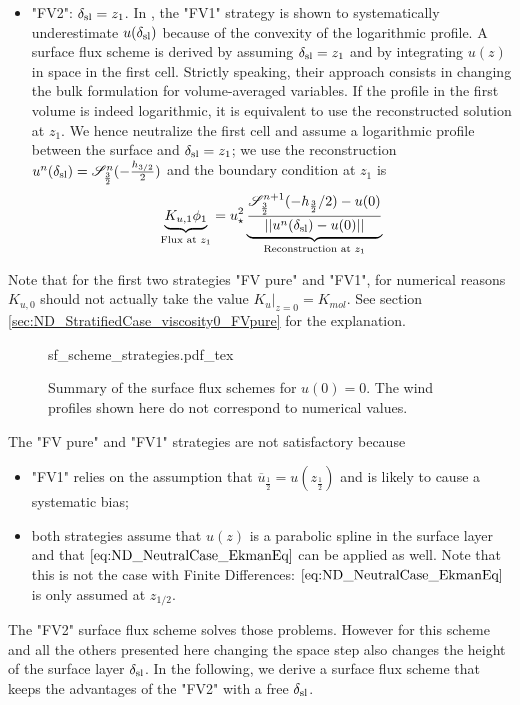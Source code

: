 \begin{itemize}
    \item "FV2":  $\delta_{\rm sl} = z_{1}$. In
    \cite{nishizawa_surface_2018}, the "FV1" strategy is shown to systematically
	  underestimate $u(\delta_{\rm sl})$ because of the 
	  convexity of the logarithmic profile.
	A surface flux scheme is derived by assuming
	  $\delta_{\rm sl} = z_1$ and by integrating $u(z)$
	  in space in the first cell.
	Strictly speaking, their approach consists in changing the
	bulk formulation for volume-averaged variables. If the
	profile in the first volume is indeed logarithmic, it
	is equivalent to use the reconstructed solution at
	$z_1$. We hence neutralize the first cell and assume
	a logarithmic profile between the surface and
	$\delta_{\rm sl}=z_1$;
	we use the reconstruction
	$u^n(\delta_{\rm sl}) = {\cal S}^n_{\frac{3}{2}}(
	  -\frac{h_{3/2}}{2})$ and the boundary condition
		  at $z_1$ is
	\begin{equation}
		\underbrace{K_{u,1} \phi_1}_{\text{Flux at } z_1}
		= u_\star^2 
		  \underbrace{\frac{{\cal S}_{\frac{3}{2}}^{n+1}
			(-h_{\frac{3}{2}}/2)-u(0)}
			{||u^n(\delta_{\rm sl})-u(0)||}}_{
				\text{Reconstruction at } z_1
			}
	\end{equation}
	  
  \end{itemize}
  Note that for the first two strategies "FV pure" and
  "FV1", for numerical reasons $K_{u,0}$
  should not actually
  take the value $\left. K_{u}\right|_{z=0} = K_{mol}$.
  See section \ref{sec:ND_StratifiedCase_viscosity0_FVpure} for
  the explanation.

\begin{figure}
	\centering
	{sf_scheme_strategies.pdf_tex}
	\caption{Summary of the surface flux schemes for $u(0)=0$.
	The wind profiles shown here do not correspond to
	numerical values.}
	\label{fig:ND_NeutralCase_summary_sfscheme}
\end{figure}

The "FV pure" and "FV1" strategies are not satisfactory because
\begin{itemize}
	\item "FV1" relies on the assumption that
		$\overline{u}_{\frac{1}{2}} = u(z_{\frac{1}{2}})$
		and is likely to cause a systematic bias;
	\item both strategies assume that $u(z)$ is a parabolic spline in the surface layer and that $\eqref{eq:ND_NeutralCase_EkmanEq}$
		can be applied as well. Note that this is not
		the case with Finite Differences:
		$\eqref{eq:ND_NeutralCase_EkmanEq}$ is only assumed
		at $z_{1/2}$.
\end{itemize}
The "FV2" surface flux scheme solves those problems.
However for this scheme and all the others presented here
changing the space step
also changes the height of the surface layer $\delta_{\rm sl}$.
In the following, we derive a surface flux scheme that keeps
the advantages of the "FV2" with a free $\delta_{\rm sl}$.
%
